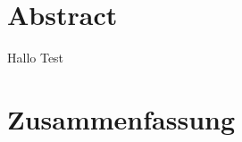 
\clearpage
{}
\section*{Abstract}

\begin{center}
\begin{minipage}[t]{0.7\textwidth}
	Hallo Test
\end{minipage}
\end{center}

\vfill

\section*{Zusammenfassung}

\begin{center}
\begin{minipage}[t]{0.7\textwidth}
	\blindtext[2]
\end{minipage}
\end{center}

\vfill

\thispagestyle{empty}